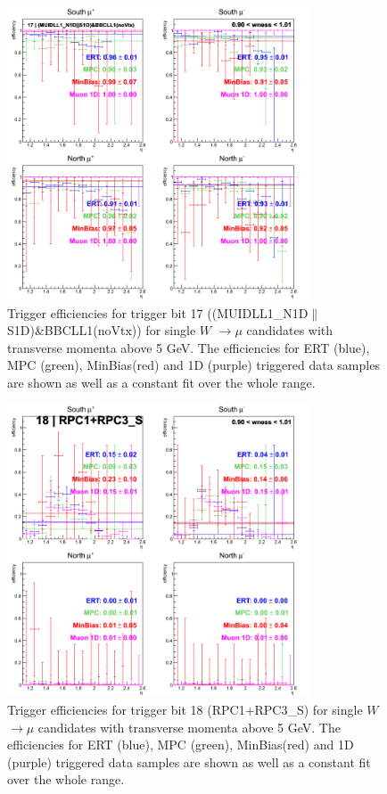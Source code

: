 \clearpage

\begin{figure}[ht]
\begin{center}
\includegraphics[width=0.8\textwidth]{./figures/run13_trigeffieta_w1_trig17_lin.png}
\caption{\label{fig:run13_trigeffieta_w0_nper0_trig17_lin} Trigger efficiencies for trigger bit 17 ((MUIDLL1\_N1D$\|$S1D)\&BBCLL1(noVtx)) for single $W$ $\rightarrow \mu$ candidates with transverse momenta above 5 GeV. The efficiencies for ERT (blue), MPC (green), MinBias(red) and 1D (purple) triggered data samples are shown as well as a constant fit over the whole range.}
\end{center}
\end{figure}
\begin{figure}[ht]
\begin{center}
\includegraphics[width=0.8\textwidth]{./figures/run13_trigeffieta_w1_trig18_lin.png}
\caption{\label{fig:run13_trigeffieta_w0_nper0_trig18_lin} Trigger efficiencies for trigger bit 18 (RPC1+RPC3\_S) for single $W$ $\rightarrow \mu$ candidates with transverse momenta above 5 GeV. The efficiencies for ERT (blue), MPC (green), MinBias(red) and 1D (purple) triggered data samples are shown as well as a constant fit over the whole range.}
\end{center}
\end{figure}
